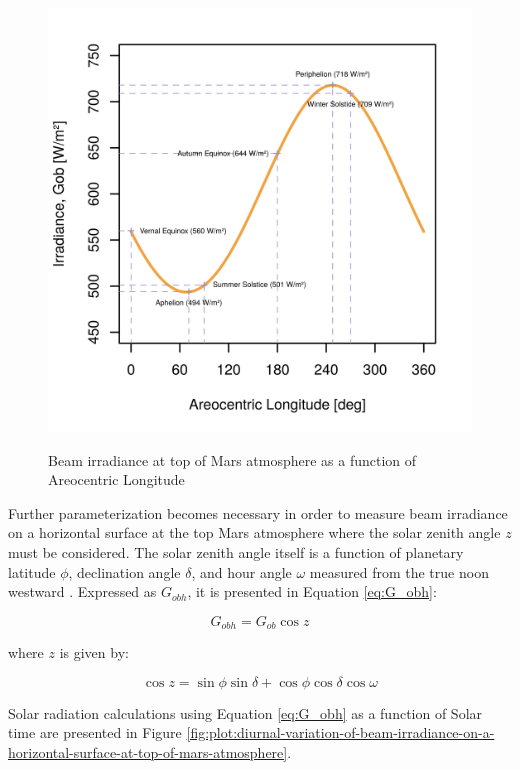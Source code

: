 \begin{figure}[H]
  \centering
  \hypersetup{linkcolor=captionTextColor}
  \includegraphics[width=0.8\linewidth]{sections/martian-environment/plots/gob-daily-variations.png}\\
  \caption[Beam irradiance at top of Mars atmosphere as a function of Areocentric Longitude]
          {Beam irradiance at top of Mars atmosphere as a function of Areocentric Longitude}
  \label{fig:plot:beam-irradiance-top-of-mars-atmosphere}
\end{figure}

Further parameterization becomes necessary in order to measure beam irradiance on a horizontal surface at the top Mars atmosphere where the solar zenith angle $z$ must be considered. The solar zenith angle itself is a function of planetary latitude $\phi$, declination angle $\delta$, and hour angle $\omega$ measured from the true noon westward . Expressed as $G_{obh}$, it is presented in Equation \ref{eq:G_obh}:

\begin{equation}
  \label{eq:G_obh}
  G_{obh} = G_{ob}\cos{z}
\end{equation}

where $z$ is given by:

\begin{equation}
  \label{eq:cosz}
  \cos{z} = \sin{\phi}\sin{\delta} + \cos{\phi}\cos{\delta}\cos{\omega}
\end{equation}

Solar radiation calculations using Equation \ref{eq:G_obh} as a function of Solar time are presented in Figure \ref{fig:plot:diurnal-variation-of-beam-irradiance-on-a-horizontal-surface-at-top-of-mars-atmosphere}.

